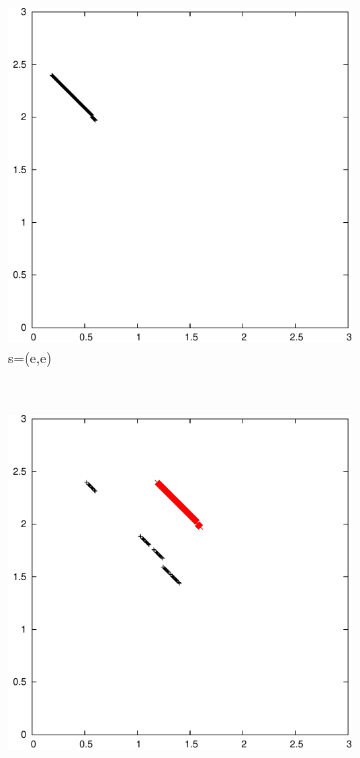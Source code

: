 \documentclass{article}
\begin{document}
	\begin{figure}
		\begin{subfigure}[b]{0.3\textwidth}
			\centering
			\includegraphics[width=\textwidth]{images/t3s0}
			\caption{s=(e,e)}
			\label{fig:t3s0}
		\end{subfigure}
		~
		\begin{subfigure}[b]{0.3\textwidth}
			\centering
			\includegraphics[width=\textwidth]{images/t3s1}

\end{subfigure}
\end{figure}
\end{document}
